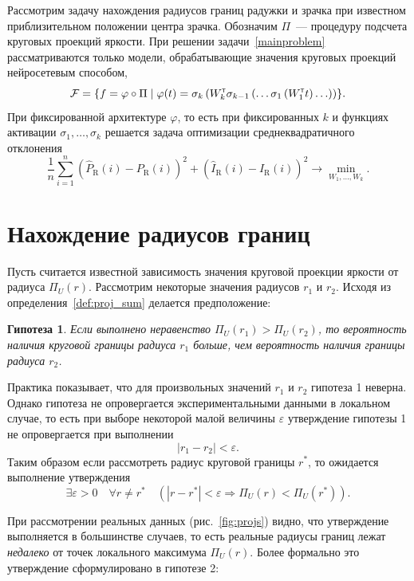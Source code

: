 \documentclass[12pt, twoside]{article}
\newtheorem{hop}{Гипотеза}
\begin{document}
Рассмотрим задачу нахождения радиусов границ радужки и зрачка при известном приблизительном положении центра зрачка. Обозначим $\Pi$~--- процедуру подсчета круговых проекций яркости. При решении задачи~\eqref{mainproblem} рассматриваются только модели, обрабатывающие значения круговых проекций нейросетевым способом,
\[
\mathcal{F} = \left\{f = \varphi \circ \Pi \mid \varphi(t) = \sigma_k\left(W_k^{\text{\tiny\sffamily\upshape\mdseries T}} \sigma_{k-1}\left(\ldots \sigma_1\left(W_1^{\text{\tiny\sffamily\upshape\mdseries T}} t\right)\ldots\right)\right)\right\}\!.
\]
При фиксированной архитектуре $\varphi$, то есть при фиксированных $k$ и функциях активации $\sigma_1, \ldots, \sigma_k$ решается задача оптимизации среднеквадратичного отклонения
\begin{equation}\label{secondproblem}
\frac{1}{n}\sum_{i=1}^n \left(\widehat{P}_\text{R}(i) - P_\text{R}(i)\right)^2 + \left(\widehat{I}_\text{R}(i) - I_\text{R}(i)\right)^2 \to \min_{W_1, \ldots, W_k}.
\end{equation}

\section{Нахождение радиусов границ}

Пусть считается известной зависимость значения круговой проекции яркости от радиуса $\Pi_U(r)$. Рассмотрим некоторые значения радиусов $r_1$ и $r_2$. Исходя из определения~\ref{def:proj_sum} делается предположение:
\begin{hop}
Если выполнено неравенство $\Pi_U(r_1) > \Pi_U(r_2)$, то вероятность наличия круговой границы радиуса $r_1$ больше, чем вероятность наличия границы радиуса $r_2$.
\end{hop}

Практика показывает, что для произвольных значений $r_1$ и $r_2$ гипотеза 1 неверна. Однако гипотеза не опровергается экспериментальными данными в локальном случае, то есть при выборе некоторой малой величины $\varepsilon$ утверждение гипотезы 1 не опровергается при выполнении
\[
|r_1-r_2| < \varepsilon.
\]
Таким образом если рассмотреть радиус круговой границы $r^*$, то ожидается выполнение утверждения
\[
\exists \varepsilon > 0 \quad \forall r \neq r^* \quad \left(|r-r^*| < \varepsilon \Longrightarrow \Pi_U(r) < \Pi_U(r^*)\right).
\]

При рассмотрении реальных данных (рис.~\ref{fig:projs}) видно, что утверждение выполняется в большинстве случаев, то есть реальные радиусы границ лежат \emph{недалеко} от точек локального максимума $\Pi_U(r)$. Более формально это утверждение сформулировано в гипотезе 2:
\end{document}
